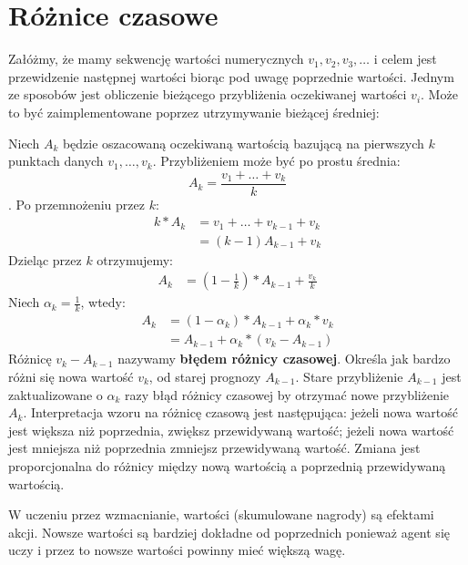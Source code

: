 \documentclass[a4paper, 12pt,oneside]{book}
\begin{document}
\section{Różnice czasowe}
Załóżmy, że mamy sekwencję wartości numerycznych $v_1,v_2,v_3,\dots$ i celem
jest przewidzenie następnej wartości biorąc pod uwagę poprzednie wartości.
Jednym ze sposobów jest obliczenie bieżącego przybliżenia oczekiwanej wartości
$v_i$. Może to być zaimplementowane poprzez utrzymywanie bieżącej średniej:

Niech $A_k$ będzie oszacowaną oczekiwaną wartością bazującą na pierwszych $k$
punktach danych $v_1, \dots, v_k$. Przybliżeniem może być po prostu średnia:
\[A_k = \frac{v_1 + \dots + v_k}{k}\].
Po przemnożeniu przez $k$:
\begin{equation} \label{td_1}
\begin{split}
	k * A_k &= v_1 + \dots + v_{k-1} + v_k \\
	        &= (k-1)A_{k-1} + v_k
\end{split}
\end{equation}
Dzieląc przez $k$ otrzymujemy:
\begin{equation} \label{td_2}
\begin{split}
	A_k &= \left( 1 - \frac{1}{k} \right) * A_{k-1} + \frac{v_k}{k}
\end{split}
\end{equation}
Niech $\alpha_k = \frac{1}{k}$, wtedy:
\begin{equation} \label{td_3}
\begin{split}
	A_k &= (1 - \alpha_k) * A_{k-1} + \alpha_k * v_k \\
	    &= A_{k-1} + \alpha_k * (v_k - A_{k-1})
\end{split}
\end{equation}
Różnicę $v_k - A_{k-1}$ nazywamy \textbf{błędem różnicy czasowej}. Określa jak
bardzo różni się nowa wartość $v_k$, od starej prognozy $A_{k-1}$. Stare
przybliżenie $A_{k-1}$ jest zaktualizowane o $\alpha_k$ razy błąd różnicy
czasowej by otrzymać nowe przybliżenie $A_k$. Interpretacja wzoru na różnicę
czasową jest następująca: jeżeli nowa wartość jest większa niż poprzednia,
zwiększ przewidywaną wartość; jeżeli nowa wartość jest mniejsza niż poprzednia
zmniejsz przewidywaną wartość. Zmiana jest proporcjonalna do różnicy między
nową wartością a poprzednią przewidywaną wartością.

W uczeniu przez wzmacnianie, wartości (skumulowane nagrody) są efektami akcji.
Nowsze wartości są bardziej dokładne od poprzednich ponieważ agent się uczy i
przez to nowsze wartości powinny mieć większą wagę.
\end{document}
